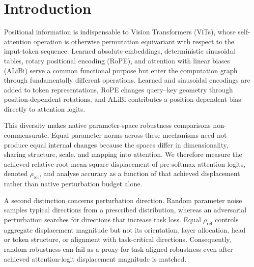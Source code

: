 \documentclass[preprint,12pt,authoryear]{elsarticle}
\begin{document}
\section{Introduction}
\label{sec:introduction}

Positional information is indispensable to Vision Transformers (ViTs),
whose self-attention operation is otherwise permutation equivariant with
respect to the input-token sequence. Learned absolute embeddings,
deterministic sinusoidal tables, rotary positional encoding (RoPE), and
attention with linear biases (ALiBi) serve a common functional purpose but
enter the computation graph through fundamentally different operations.
Learned and sinusoidal encodings are added to token representations, RoPE
changes query--key geometry through position-dependent rotations, and
ALiBi contributes a position-dependent bias directly to attention logits.

This diversity makes native parameter-space robustness comparisons
non-commensurate. Equal parameter norms across these mechanisms need not
produce equal internal changes because the spaces differ in dimensionality,
sharing structure, scale, and mapping into attention. We therefore measure
the achieved relative root-mean-square displacement of pre-softmax
attention logits, denoted $\rho_{\mathrm{rel}}$, and analyse accuracy as a
function of that achieved displacement rather than native perturbation
budget alone.

A second distinction concerns perturbation direction. Random parameter
noise samples typical directions from a prescribed distribution, whereas
an adversarial perturbation searches for directions that increase task
loss. Equal $\rho_{\mathrm{rel}}$ controls aggregate displacement
magnitude but not its orientation, layer allocation, head or token
structure, or alignment with task-critical directions. Consequently,
random robustness can fail as a proxy for task-aligned robustness even
after achieved attention-logit displacement magnitude is matched.
\end{document}
